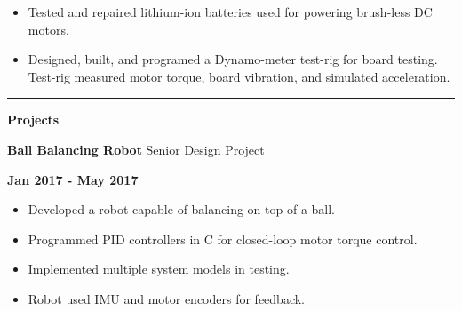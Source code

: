 \documentclass[paper=a4,fontsize=11pt]{article} %
\def \sectionSpace      {0.3cm}    %
\def \leftColSpace      {0.1}       %
\def \middleColSpace    {0.71}       %
\def \bigMiddleColSpace {0.8}       %
\def \rightColSpace     {0.25}      %
\def \lineWidth         {20.25cm}   %
\def \lineThickness     {1pt}     %
\begin{document}
    \noindent
    \begin{minipage}[t]{\leftColSpace\linewidth}
        \hfill
    \end{minipage}
    \begin{minipage}[t]{\bigMiddleColSpace\linewidth}
        \begin{itemize}[noitemsep,topsep=0pt]
        \item Tested and repaired lithium-ion batteries used for powering brush-less DC motors. 
        \item Designed, built, and programed a Dynamo-meter test-rig for board testing. Test-rig measured motor torque, board vibration, and simulated acceleration.
        \end{itemize}
    \end{minipage}
    
    \vspace{\sectionSpace}
    \noindent\rule{\lineWidth}{\lineThickness}

    \noindent
    \begin{minipage}[t]{\leftColSpace\linewidth}
        \noindent \textbf{Projects}
    \end{minipage}
    \begin{minipage}[t]{\middleColSpace\linewidth}
        \noindent \textbf{Ball Balancing Robot } \quad Senior Design Project
    \end{minipage}
    \begin{minipage}[t]{\rightColSpace\linewidth}
        \noindent \textbf{Jan 2017 - May 2017}
    \end{minipage}

    \noindent
    \begin{minipage}[t]{\leftColSpace\linewidth}
        \hfill
    \end{minipage}
    \begin{minipage}[t]{\bigMiddleColSpace\linewidth}
        \begin{itemize}[noitemsep,topsep=0pt]
        \item Developed a robot capable of balancing on top of a ball. 
        \item Programmed PID controllers in C for closed-loop motor torque control. 
        \item Implemented multiple system models in testing. 
        \item Robot used IMU and motor encoders for feedback.
        \end{itemize}
    \end{minipage}
\end{document}
